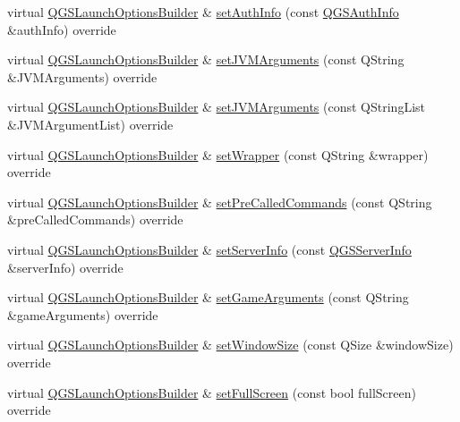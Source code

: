 \begin{DoxyCompactItemize}
\item 
virtual \mbox{\hyperlink{class_q_g_s_launch_options_builder}{Q\+G\+S\+Launch\+Options\+Builder}} \& \mbox{\hyperlink{class_q_g_s_launch_options_builder_a01f8d9b1f6efde74a5a22013d3555c6a}{set\+Auth\+Info}} (const \mbox{\hyperlink{class_q_g_s_auth_info}{Q\+G\+S\+Auth\+Info}} \&auth\+Info) override
\item 
virtual \mbox{\hyperlink{class_q_g_s_launch_options_builder}{Q\+G\+S\+Launch\+Options\+Builder}} \& \mbox{\hyperlink{class_q_g_s_launch_options_builder_ad0f4f7bc30016b6ceb79d91330f8e6a1}{set\+J\+V\+M\+Arguments}} (const Q\+String \&J\+V\+M\+Arguments) override
\item 
virtual \mbox{\hyperlink{class_q_g_s_launch_options_builder}{Q\+G\+S\+Launch\+Options\+Builder}} \& \mbox{\hyperlink{class_q_g_s_launch_options_builder_a6db06aa915c13411c202e404acb5dd9f}{set\+J\+V\+M\+Arguments}} (const Q\+String\+List \&J\+V\+M\+Argument\+List) override
\item 
virtual \mbox{\hyperlink{class_q_g_s_launch_options_builder}{Q\+G\+S\+Launch\+Options\+Builder}} \& \mbox{\hyperlink{class_q_g_s_launch_options_builder_a0f273717f178f93bb964d34e333110e9}{set\+Wrapper}} (const Q\+String \&wrapper) override
\item 
virtual \mbox{\hyperlink{class_q_g_s_launch_options_builder}{Q\+G\+S\+Launch\+Options\+Builder}} \& \mbox{\hyperlink{class_q_g_s_launch_options_builder_a83840a81a87e550a9140cea27cf73af1}{set\+Pre\+Called\+Commands}} (const Q\+String \&pre\+Called\+Commands) override
\item 
virtual \mbox{\hyperlink{class_q_g_s_launch_options_builder}{Q\+G\+S\+Launch\+Options\+Builder}} \& \mbox{\hyperlink{class_q_g_s_launch_options_builder_a3403f2bb452763be236c8dd21bcb6f4c}{set\+Server\+Info}} (const \mbox{\hyperlink{class_q_g_s_server_info}{Q\+G\+S\+Server\+Info}} \&server\+Info) override
\item 
virtual \mbox{\hyperlink{class_q_g_s_launch_options_builder}{Q\+G\+S\+Launch\+Options\+Builder}} \& \mbox{\hyperlink{class_q_g_s_launch_options_builder_a6e6403b36902ac004af9ed2e9a9726c6}{set\+Game\+Arguments}} (const Q\+String \&game\+Arguments) override
\item 
virtual \mbox{\hyperlink{class_q_g_s_launch_options_builder}{Q\+G\+S\+Launch\+Options\+Builder}} \& \mbox{\hyperlink{class_q_g_s_launch_options_builder_a4c7d32950b863301370a8547c2562dfd}{set\+Window\+Size}} (const Q\+Size \&window\+Size) override
\item 
virtual \mbox{\hyperlink{class_q_g_s_launch_options_builder}{Q\+G\+S\+Launch\+Options\+Builder}} \& \mbox{\hyperlink{class_q_g_s_launch_options_builder_a8d77cb303f2d490ef5eea478518c7d8d}{set\+Full\+Screen}} (const bool full\+Screen) override

\end{DoxyCompactItemize}
